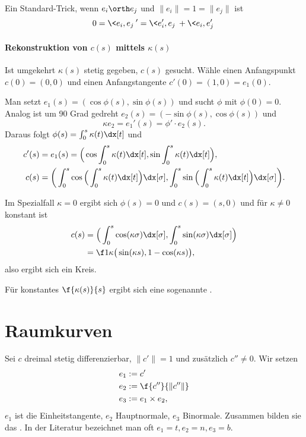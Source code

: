 Ein Standard-Trick, wenn $e_i \orth e_j$ und $\|e_i\| = 1 = \|e_j\|$ ist
\[
	0 = \<e_i, e_j\>'
	= \<e_i', e_j\> + \<e_i, e_j'\>
\]

\paragraph{Rekonstruktion von $c(s)$ mittels $\kappa(s)$}

Ist umgekehrt $\kappa(s)$ stetig gegeben, $c(s)$ gesucht.
Wähle einen Anfangspunkt $c(0) = (0,0)$ und einen Anfangstangente $c'(0) = (1,0) = e_1(0)$.

Man setzt $e_1(s) = (\cos \phi(s), \sin \phi(s))$ und sucht $\phi$ mit $\phi(0) = 0$.
Analog ist um 90 Grad gedreht $e_2(s) = (-\sin \phi(s), \cos \phi(s))$ und
\[
	\kappa e_2
	= e_1' (s)
	= \phi'\cdot e_2 (s).
\]
Daraus folgt $\phi(s) = \int_0^s \kappa(t) \dx[t]$ und
\begin{align*}
	c'(s) &= e_1(s) = \Big( \cos \int_0^s \kappa(t) \dx[t], \sin \int_0^s \kappa(t) \dx[t] \Big), \\
	c(s) &= \bigg( \int_0^s \cos \Big( \int_0^s \kappa(t) \dx[t]\Big) \dx[\sigma], \int_0^s \sin \Big( \int_0^s \kappa(t) \dx[t] \Big) \dx[\sigma] \bigg).
\end{align*}

Im Spezialfall $\kappa = 0$ ergibt sich $\phi(s) = 0$ und $c(s) = (s, 0)$ und für $\kappa \neq 0$ konstant ist
\begin{align*}
	c(s) &= \Big( \int_0^s \cos (\kappa \sigma) \dx[\sigma] , \int_0^s \sin(\kappa \sigma) \dx[\sigma] \Big) \\
	&= \f 1\kappa \big( \sin (\kappa s), 1 - \cos (\kappa s) \big),
\end{align*}
also ergibt sich ein Kreis.

Für konstantes $\f{\kappa(s)}{s}$ ergibt sich eine sogenannte .


\section{Raumkurven}

Sei $c$ dreimal stetig differenzierbar, $\|c'\| = 1$ und zusätzlich $c'' \neq 0$.
Wir setzen
\begin{align*}
	e_1 &:= c' \\
	e_2 &:= \f {c''}{\|c''\|} \\
	e_3 &:= e_1 \times e_2,
\end{align*}
$e_1$ ist die Einheitstangente, $e_2$ Hauptnormale, $e_3$ Binormale.
Zusammen bilden sie das .
In der Literatur bezeichnet man oft $e_1 = t, e_2 = n, e_3 = b$.

